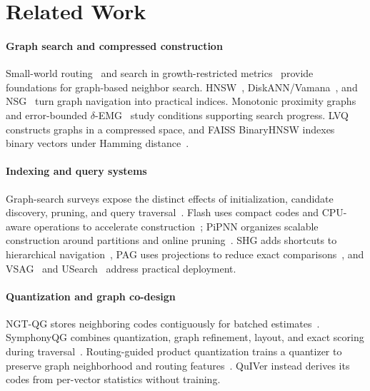 \section{Related Work}
\label{sec:related}
\paragraph{Graph search and compressed construction}
Small-world routing~\cite{kleinberg2000smallworld} and search in growth-restricted metrics~\cite{karger2002growth} provide foundations for graph-based neighbor search. HNSW~\cite{malkov2020hnsw}, DiskANN/Vamana~\cite{jayaram2019diskann}, and NSG~\cite{fu2019nsg} turn graph navigation into practical indices. Monotonic proximity graphs~\cite{zhu2021monotonic} and error-bounded $\delta$-EMG~\cite{xiang2025emg} study conditions supporting search progress. LVQ~\cite{aguerrebere2023lvq} constructs graphs in a compressed space, and FAISS BinaryHNSW indexes binary vectors under Hamming distance~\cite{faissbinary}.

\paragraph{Indexing and query systems}
Graph-search surveys expose the distinct effects of initialization, candidate discovery, pruning, and query traversal~\cite{wang2021graphsurvey}. Flash uses compact codes and CPU-aware operations to accelerate construction~\cite{wang2025flash}; PiPNN organizes scalable construction around partitions and online pruning~\cite{dong2026pipnn}. SHG adds shortcuts to hierarchical navigation~\cite{gong2025shg}, PAG uses projections to reduce exact comparisons~\cite{lu2026pag}, and VSAG~\cite{zhong2025vsag} and USearch~\cite{usearch2024} address practical deployment.

\paragraph{Quantization and graph co-design}
NGT-QG stores neighboring codes contiguously for batched estimates~\cite{ngt}. SymphonyQG combines quantization, graph refinement, layout, and exact scoring during traversal~\cite{gou2025symphony}. Routing-guided product quantization trains a quantizer to preserve graph neighborhood and routing features~\cite{yue2024rpq}. QuIVer instead derives its codes from per-vector statistics without training.

